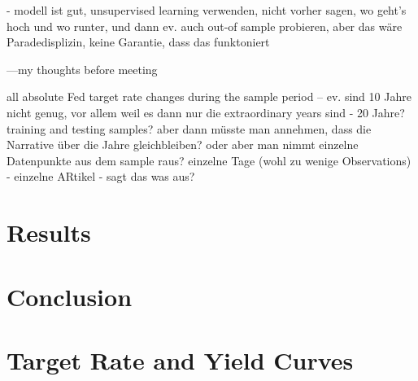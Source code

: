 \documentclass[11pt,a4paper,english,oneside]{book}
\numberwithin{equation}{chapter}
\begin{document}
- modell ist gut, unsupervised learning verwenden, nicht vorher sagen, wo geht's hoch und wo runter, und dann ev. auch out-of sample probieren, aber das wäre Paradedisplizin, keine Garantie, dass das funktoniert

---my thoughts before meeting

all absolute Fed target rate changes during the sample period -- ev. sind 10 Jahre nicht genug, vor allem weil es dann nur die extraordinary years sind - 20 Jahre? training and testing samples? aber dann müsste man annehmen, dass die Narrative über die Jahre gleichbleiben? oder aber man nimmt einzelne Datenpunkte aus dem sample raus? einzelne Tage (wohl zu wenige Observations) - einzelne ARtikel - sagt das was aus?


\chapter{Results}

\chapter{Conclusion}


\newpage

{} 





\newpage

\appendix
\noappendicestocpagenum
\addappheadtotoc



\renewcommand{\theequation}{A.\arabic{equation}}


\chapter{Target Rate and Yield Curves}\label{AppendixA}
\vspace{-0.5cm}
\end{document}
